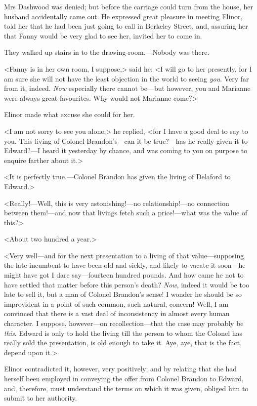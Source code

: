 Mrs Dashwood was denied; but before the carriage could turn from the house, her husband accidentally came out. He expressed great pleasure in meeting Elinor, told her that he had been just going to call in Berkeley Street, and, assuring her that Fanny would be very glad to see her, invited her to come in.

They walked up stairs in to the drawing-room.—Nobody was there.

<Fanny is in her own room, I suppose,> said he: <I will go to her presently, for I am sure she will not have the least objection in the world to seeing \textit{you}. Very far from it, indeed. \textit{Now} especially there cannot be—but however, you and Marianne were always great favourites. Why would not Marianne come?>

Elinor made what excuse she could for her.

<I am not sorry to see you alone,> he replied, <for I have a good deal to say to you. This living of Colonel Brandon's—can it be true?—has he really given it to Edward?—I heard it yesterday by chance, and was coming to you on purpose to enquire farther about it.>

<It is perfectly true.—Colonel Brandon has given the living of Delaford to Edward.>

<Really!—Well, this is very astonishing!—no relationship!—no connection between them!—and now that livings fetch such a price!—what was the value of this?>

<About two hundred a year.>

<Very well—and for the next presentation to a living of that value—supposing the late incumbent to have been old and sickly, and likely to vacate it soon—he might have got I dare say—fourteen hundred pounds. And how came he not to have settled that matter before this person's death? \textit{Now}, indeed it would be too late to sell it, but a man of Colonel Brandon's sense! I wonder he should be so improvident in a point of such common, such natural, concern! Well, I am convinced that there is a vast deal of inconsistency in almost every human character. I suppose, however—on recollection—that the case may probably be \textit{this}. Edward is only to hold the living till the person to whom the Colonel has really sold the presentation, is old enough to take it. Aye, aye, that is the fact, depend upon it.>

Elinor contradicted it, however, very positively; and by relating that she had herself been employed in conveying the offer from Colonel Brandon to Edward, and, therefore, must understand the terms on which it was given, obliged him to submit to her authority.

